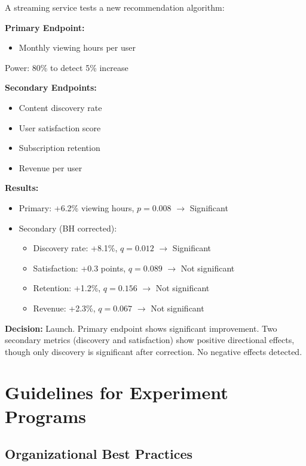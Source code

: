 \begin{example}
A streaming service tests a new recommendation algorithm:

\textbf{Primary Endpoint:}
\begin{itemize}
    \item Monthly viewing hours per user
\end{itemize}
Power: 80\% to detect 5\% increase

\textbf{Secondary Endpoints:}
\begin{itemize}
    \item Content discovery rate
    \item User satisfaction score
    \item Subscription retention
    \item Revenue per user
\end{itemize}

\textbf{Results:}
\begin{itemize}
    \item Primary: +6.2\% viewing hours, $p = 0.008$ $\rightarrow$ Significant
    \item Secondary (BH corrected):
    \begin{itemize}
        \item Discovery rate: +8.1\%, $q = 0.012$ $\rightarrow$ Significant
        \item Satisfaction: +0.3 points, $q = 0.089$ $\rightarrow$ Not significant
        \item Retention: +1.2\%, $q = 0.156$ $\rightarrow$ Not significant
        \item Revenue: +2.3\%, $q = 0.067$ $\rightarrow$ Not significant
    \end{itemize}
\end{itemize}

\textbf{Decision:} Launch. Primary endpoint shows significant improvement. Two secondary metrics (discovery and satisfaction) show positive directional effects, though only discovery is significant after correction. No negative effects detected.
\end{example}

\section{Guidelines for Experiment Programs}

\subsection{Organizational Best Practices}

